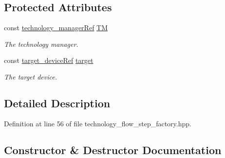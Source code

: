 \subsection*{Protected Attributes}
\begin{DoxyCompactItemize}
\item 
const \hyperlink{technology__manager_8hpp_a4b9ecd440c804109c962654f9227244e}{technology\+\_\+manager\+Ref} \hyperlink{classTechnologyFlowStepFactory_ab515494e57323a3f703c670bf75bb84c}{TM}
\begin{DoxyCompactList}\small\item\em The technology manager. \end{DoxyCompactList}\item 
const \hyperlink{target__device_8hpp_acedb2b7a617e27e6354a8049fee44eda}{target\+\_\+device\+Ref} \hyperlink{classTechnologyFlowStepFactory_a798bf9e7a0e488fb3ede977df87feb1c}{target}
\begin{DoxyCompactList}\small\item\em The target device. \end{DoxyCompactList}\end{DoxyCompactItemize}


\subsection{Detailed Description}


Definition at line 56 of file technology\+\_\+flow\+\_\+step\+\_\+factory.\+hpp.



\subsection{Constructor \& Destructor Documentation}
\mbox{\label{classTechnologyFlowStepFactory_a6e82bde59f8e24bfa80765bf8d9085d5}} 
